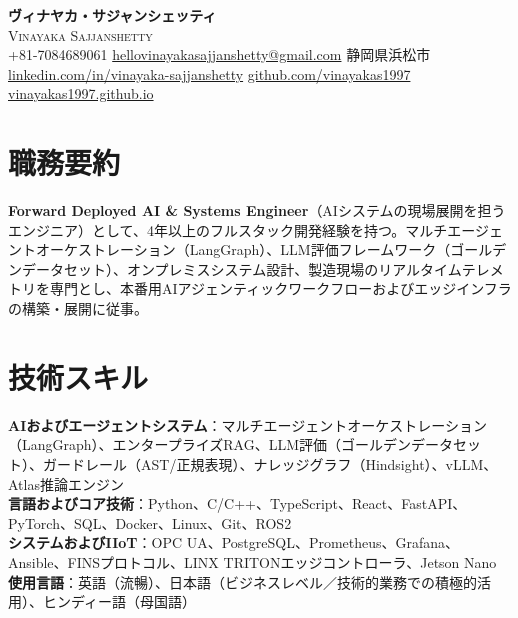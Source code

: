 \documentclass[letterpaper,10pt]{article}
\begin{document}
\begin{center}
    \textbf{\Huge ヴィナヤカ・サジャンシェッティ} \\ \vspace{1pt}
    \small \textsc{Vinayaka Sajjanshetty} \\ \vspace{2pt}
    \small
    \faPhone \thinspace +81-7084689061 \quad
    \faEnvelope \thinspace \href{mailto:hellovinayakasajjanshetty@gmail.com}{hellovinayakasajjanshetty@gmail.com} \quad
    \faMapMarker \thinspace 静岡県浜松市 \\ \vspace{1pt}
    \faLinkedin \thinspace \href{https://www.linkedin.com/in/vinayaka-sajjanshetty-91033111a}{linkedin.com/in/vinayaka-sajjanshetty} \quad
    \faGithub \thinspace \href{https://github.com/vinayakas1997}{github.com/vinayakas1997} \quad
    \faGlobe \thinspace \href{https://vinayakas1997.github.io/my-project-docs/}{vinayakas1997.github.io}
\end{center}


\section{職務要約}
 \begin{itemize}[leftmargin=0.15in, label={}]
    \small{\item{
     \textbf{Forward Deployed AI \& Systems Engineer}（AIシステムの現場展開を担うエンジニア）として、4年以上のフルスタック開発経験を持つ。マルチエージェントオーケストレーション（LangGraph）、LLM評価フレームワーク（ゴールデンデータセット）、オンプレミスシステム設計、製造現場のリアルタイムテレメトリを専門とし、本番用AIアジェンティックワークフローおよびエッジインフラの構築・展開に従事。
    }}
 \end{itemize}


\section{技術スキル}
 \begin{itemize}[leftmargin=0.15in, label={}]
    \small{\item{
     \textbf{AIおよびエージェントシステム}{：マルチエージェントオーケストレーション（LangGraph）、エンタープライズRAG、LLM評価（ゴールデンデータセット）、ガードレール（AST/正規表現）、ナレッジグラフ（Hindsight）、vLLM、Atlas推論エンジン} \\
     \textbf{言語およびコア技術}{：Python、C/C++、TypeScript、React、FastAPI、PyTorch、SQL、Docker、Linux、Git、ROS2} \\
     \textbf{システムおよびIIoT}{：OPC UA、PostgreSQL、Prometheus、Grafana、Ansible、FINSプロトコル、LINX TRITONエッジコントローラ、Jetson Nano} \\
     \textbf{使用言語}{：英語（流暢）、日本語（ビジネスレベル／技術的業務での積極的活用）、ヒンディー語（母国語）}
    }}
 \end{itemize}
\end{document}
